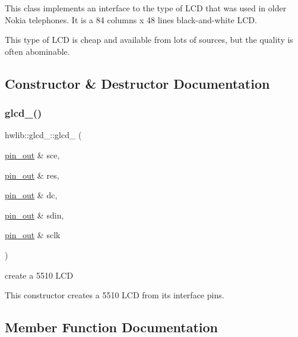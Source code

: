 This class implements an interface to the type of L\+CD that was used in older Nokia telephones. It is a 84 columns x 48 lines black-\/and-\/white L\+CD.

This type of L\+CD is cheap and available from lots of sources, but the quality is often abominable.

 

\subsection{Constructor \& Destructor Documentation}
\mbox{\label{classhwlib_1_1glcd__5510_a689cb8a2f60f76f087b83626b2ca931a}} 
\subsubsection{\texorpdfstring{glcd\+\_()}{glcd\_5510()}}
{\footnotesize\ttfamily hwlib\+::glcd\+\_\+::glcd\+\_ (\begin{DoxyParamCaption}\item[{\hyperlink{classhwlib_1_1pin__out}{pin\+\_\+out} \&}]{sce,  }\item[{\hyperlink{classhwlib_1_1pin__out}{pin\+\_\+out} \&}]{res,  }\item[{\hyperlink{classhwlib_1_1pin__out}{pin\+\_\+out} \&}]{dc,  }\item[{\hyperlink{classhwlib_1_1pin__out}{pin\+\_\+out} \&}]{sdin,  }\item[{\hyperlink{classhwlib_1_1pin__out}{pin\+\_\+out} \&}]{sclk }\end{DoxyParamCaption})\hspace{0.3cm}{\ttfamily [inline]}}

create a 5510 L\+CD

This constructor creates a 5510 L\+CD from its interface pins. 

\subsection{Member Function Documentation}
\mbox{\label{classhwlib_1_1glcd__5510_a533b2663e151bee909543d0038b2cb4d}} 
